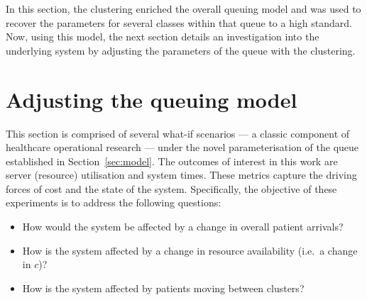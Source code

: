 \documentclass[11pt]{article}
\newlength{\tabwidth}
\begin{document}
\begin{table}
    \centering
    \caption{A comparison of the observed data, and the best and worst simulated
        data based on the model parameters and summary statistics for length of
    stay (LOS).}\label{tab:comparison}
\end{table}

In this section, the clustering enriched the overall queuing model and was used
to recover the parameters for several classes within that queue to a high
standard. Now, using this model, the next section details an investigation into
the underlying system by adjusting the parameters of the queue with the
clustering.

\section{Adjusting the queuing model}\label{sec:scenarios}

This section is comprised of several what-if scenarios --- a classic component
of healthcare operational research --- under the novel parameterisation of the
queue established in Section~\ref{sec:model}. The outcomes of interest in this
work are server (resource) utilisation and system times. These metrics capture
the driving forces of cost and the state of the system. Specifically, the
objective of these experiments is to address the following questions:
\begin{itemize}
    \item How would the system be affected by a change in overall patient
        arrivals?
    \item How is the system affected by a change in resource availability (i.e.\
        a change in \(c\))?
    \item How is the system affected by patients moving between clusters?
\end{itemize}
\end{document}

